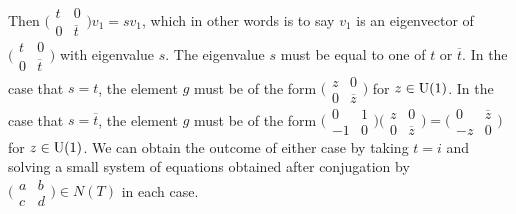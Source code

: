 \documentclass[../../rtnotes.tex]{subfiles}
\begin{document}
Then $\bigl(\!\begin{smallmatrix}
    t & 0 \\ 0 & \overline t
\end{smallmatrix}\!\bigr)v_1 = sv_1$, which in other words is to say $v_1$ is an eigenvector of $\bigl(\!\begin{smallmatrix}
    t & 0 \\ 0 & \overline t
\end{smallmatrix}\!\bigr)$ with eigenvalue $s$. The eigenvalue $s$ must be equal to one of $t$ or $\overline t$. In the case that $s = t$, the element $g$ must be of the form $\bigl(\!\begin{smallmatrix}
    z & 0 \\ 0 & \overline z
\end{smallmatrix}\!\bigr)$ for $z\in \operatorname{U}(1)$. In the case that $s = \overline t$, the element $g$ must be of the form $\bigl(\!\begin{smallmatrix}
    0 & 1 \\ -1 & 0
\end{smallmatrix}\!\bigr)\bigl(\!\begin{smallmatrix}
    z & 0 \\ 0 & \overline z
\end{smallmatrix}\!\bigr) = \bigl(\!\begin{smallmatrix}
    0 & \overline z \\ -z & 0
\end{smallmatrix}\!\bigr)$ for $z\in \operatorname{U}(1)$. We can obtain the outcome of either case by taking $t = i$ and solving a small system of equations obtained after conjugation by $\bigl(\!\begin{smallmatrix}
    a& b \\ c & d
\end{smallmatrix}\!\bigr)\in N(T)$ in each case. 
\end{document}
